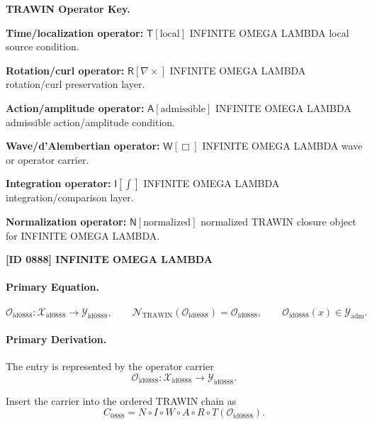 \par\vspace{0.45\baselineskip}
\noindent\begin{minipage}[t]{\linewidth}
\begingroup
\small
\raggedright
\textbf{TRAWIN Operator Key.}\par
\noindent\textbf{Time/localization operator:} $\mathsf{T}\!\left[\mathrm{local}\right]$ INFINITE OMEGA LAMBDA local source condition.\par
\noindent\textbf{Rotation/curl operator:} $\mathsf{R}\!\left[\nabla\times\right]$ INFINITE OMEGA LAMBDA rotation/curl preservation layer.\par
\noindent\textbf{Action/amplitude operator:} $\mathsf{A}\!\left[\mathrm{admissible}\right]$ INFINITE OMEGA LAMBDA admissible action/amplitude condition.\par
\noindent\textbf{Wave/d'Alembertian operator:} $\mathsf{W}\!\left[\Box\right]$ INFINITE OMEGA LAMBDA wave or operator carrier.\par
\noindent\textbf{Integration operator:} $\mathsf{I}\!\left[\int\right]$ INFINITE OMEGA LAMBDA integration/comparison layer.\par
\noindent\textbf{Normalization operator:} $\mathsf{N}\!\left[\mathrm{normalized}\right]$ normalized TRAWIN closure object for INFINITE OMEGA LAMBDA.\par
\endgroup
\end{minipage}

\clearpage
\noindent\textbf{[ID 0888] INFINITE OMEGA LAMBDA}\par
\vspace{0.35em}
\paragraph{Primary Equation.}
\[
\mathcal{O}_{\mathrm{id0888}}:\mathcal{X}_{\mathrm{id0888}}\longrightarrow \mathcal{Y}_{\mathrm{id0888}},\qquad
\mathcal{N}_{\mathrm{TRAWIN}}(\mathcal{O}_{\mathrm{id0888}})=\mathcal{O}_{\mathrm{id0888}},\qquad
\mathcal{O}_{\mathrm{id0888}}(x)\in\mathcal{Y}_{\mathrm{adm}}.
\]

\paragraph{Primary Derivation.} The entry is represented by the operator carrier\[
\mathcal{O}_{\mathrm{id0888}}:\mathcal{X}_{\mathrm{id0888}}\longrightarrow \mathcal{Y}_{\mathrm{id0888}}.
\]

Insert the carrier into the ordered TRAWIN chain as\[
C_{0888}=N\circ I\circ W\circ A\circ R\circ T(\mathcal{O}_{\mathrm{id0888}}).
\]


